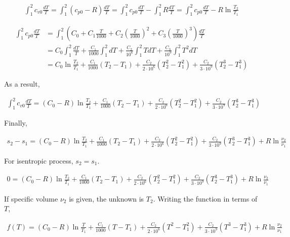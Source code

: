 \documentclass{article}
\begin{document}
	\begin{align*}
		\int_1^2 c_{v0}\frac{dT}{T}
		=
		\int_1^2 (c_{p0} - R)\frac{dT}{T}
		=
		\int_1^2 c_{p0}\frac{dT}{T} - \int_1^2 R\frac{dT}{T}
		=
		\int_1^2 c_{p0}\frac{dT}{T} - R\ln\frac{T_2}{T_1}
	\end{align*}

	\begin{align*}
		\int_1^2 c_{p0}\frac{dT}{T}
		&=
		\int_1^2 \left(C_0 + C_1\frac{T}{1000} + C_2\left(\frac{T}{1000}\right)^2 + C_3\left(\frac{T}{1000}\right)^3\right)\frac{dT}{T}\\
		&=
		C_0\int_1^2 \frac{dT}{T} + \frac{C_1}{1000}\int_1^2 dT + \frac{C_2}{10^6}\int_1^2 TdT + \frac{C_3}{10^9}\int_1^2 T^2dT\\
		&=
		C_0\ln\frac{T_2}{T_1} + \frac{C_1}{1000}(T_2 - T_1) + \frac{C_2}{2\cdot10^6}(T_2^2 - T_1^2) + \frac{C_2}{3\cdot10^9}(T_2^3 - T_1^3)
	\end{align*}

	As a result,

	\begin{align*}
		\int_1^2 c_{v0}\frac{dT}{T}
		=
		(C_0 - R)\ln\frac{T_2}{T_1} + \frac{C_1}{1000}(T_2 - T_1) + \frac{C_2}{2\cdot10^6}(T_2^2 - T_1^2) + \frac{C_2}{3\cdot10^9}(T_2^3 - T_1^3)
	\end{align*}

	Finally,

	\begin{align*}
		s_2 - s_1 = (C_0 - R)\ln\frac{T_2}{T_1} + \frac{C_1}{1000}(T_2 - T_1) + \frac{C_2}{2\cdot10^6}(T_2^2 - T_1^2) + \frac{C_2}{3\cdot10^9}(T_2^3 - T_1^3) + R\ln\frac{\nu_2}{\nu_1}
	\end{align*}

	For isentropic process, $s_2=s_1$.

	\begin{align*}
		0 = (C_0 - R)\ln\frac{T_2}{T_1} + \frac{C_1}{1000}(T_2 - T_1) + \frac{C_2}{2\cdot10^6}(T_2^2 - T_1^2) + \frac{C_2}{3\cdot10^9}(T_2^3 - T_1^3) + R\ln\frac{\nu_2}{\nu_1}
	\end{align*}

	If specific volume $\nu_2$ is given, the unknown is $T_2$. Writing the function in terms of $T$,

	\begin{align*}
		f(T) = (C_0 - R)\ln\frac{T}{T_1} + \frac{C_1}{1000}(T - T_1) + \frac{C_2}{2\cdot10^6}(T^2 - T_1^2) + \frac{C_2}{3\cdot10^9}(T^3 - T_1^3) + R\ln\frac{\nu_2}{\nu_1}
	\end{align*}
\end{document}
